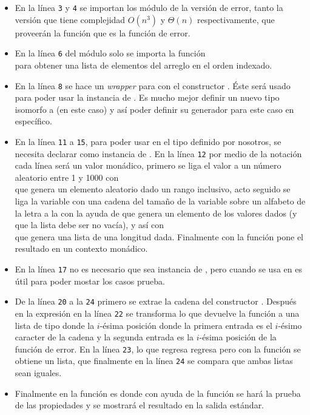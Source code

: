 \begin{itemize}
\item En la línea \texttt{3} y \texttt{4} se importan los módulo de la versión 
de error, tanto la versión que tiene complejidad $O(n^3)$ y $\Theta(n)$ 
respectivamente, que proveerán la función  que es la función de 
error.
\item En la línea \texttt{6} del módulo  solo se importa la 
función\\
 para obtener una lista de elementos del 
arreglo en el orden indexado.
\item En la línea \texttt{8} se hace un \emph{wrapper} para  con 
el constructor . Éste será usado para poder usar la instancia de 
.
Es mucho mejor definir un nuevo tipo isomorfo a (en este caso)  y 
así poder definir su generador para este caso en específico.
\item En la línea \texttt{11} a \texttt{15}, para poder usar  
en el tipo  definido por nosotros, se necesita declarar como 
instancia de .
En la línea \texttt{12} por medio de la notación  cada línea será un 
valor monádico, primero se liga el valor  a un número aleatorio 
entre 1 y 1000 con\\
 que genera un elemento aleatorio 
dado un rango inclusivo, acto seguido se liga la variable  con una 
cadena del tamaño de la variable  sobre un alfabeto de la letra 
 a la  con la ayuda de  
que genera un elemento de los valores dados (y que la lista debe ser no vacía), 
y así con\\
 que genera una lista de una 
longitud dada. Finalmente con la función  pone el resultado en un 
contexto monádico.
\item En la línea \texttt{17} no es necesario que sea instancia de 
, pero cuando se usa  en  
es útil para poder mostar los casos prueba.
\item De la línea \texttt{20} a la \texttt{24} primero se extrae la cadena 
 del constructor . 
Después en la expresión  en la línea \texttt{22} se 
transforma lo que devuelve la función  a una lista de tipo
 donde la $i$-ésima posición donde la primera entrada es 
el $i$-ésimo caracter de la cadena y la segunda entrada es la $i$-ésima 
posición de la función de error.
En la línea \texttt{23}, lo que regresa 
 regresa
 pero con la función  se obtiene un 
lista, que finalmente en la línea \texttt{24} se compara que ambas listas sean 
iguales.
\item Finalmente en la función  es donde con ayuda de la función 
 se hará la prueba de las propiedades y se mostrará el 
resultado en la salida estándar.
\end{itemize}

